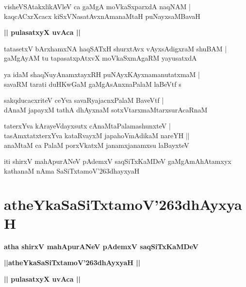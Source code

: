 \documentclass[twoside,12pt,openright]{book}
\def\S{\char'263}
\newcounter{shloka}[chapter]
\def\uvaca#1{\centerline{{\large\textbf{#1}}}}
\begin{document}
\begin{shloka}%
visheVSAtakxlikAVleV ca gaMgA moVkaSxparxdA naqNAM |\\
kaqcACxrXcacx kiSxVNasatAvxnAmanaMtaH puNayxsaMBavaH 
\end{shloka}

\uvaca{|| pulasatxyX uvAca ||}

\begin{shloka}%
tatasetxV bArxhamxNA haqSATxH shurxtAvx vAyxsAdigxraM shuBAM |\\
gaMgAyAM tu tapasatxpAtxvX moVkaSxmAgaRM yayusatxdA 
\end{shloka}

\begin{shloka}%
ya idaM shaqNuyAnamxtayxRH puNAyxKAyxnamanutatxmaM |\\
savaRM tarati duHKwGaM gaMgAsAnxnaPalaM laBeVtf s
\end{shloka}

\begin{shloka}%
sakqducacxriteV ceYva savaRyajacnxPalaM BaveVtf |\\
dAnaM japayxM tathA dhAyxnaM sotxVtarxmaMtarxsurAcaRnaM 
\end{shloka}

\begin{shloka}%
taterxYva kArayeVdayxsutx cAnaMtaPalamashunxteV |\\
tasAmxtatxterxYva kataRvayxM japahoVmAdikaM nareYH ||\\
anaMtaM ca PalaM porxVkatxM janamxjanamxsu laBayxteV 
\end{shloka}

\begin{center}
iti shirxV mahApurANeV pAdemxV saqSiTxKaMDeV gaMgAmAhAtamxyx kathanaM nAma SaSiTxtamoV\S dhayxyaH
\end{center}

\chapter{atheYkaSaSiTxtamoV\S dhAyxyaH}

\begin{center}
{\LARGE\bfseries atha shirxV mahApurANeV pAdemxV saqSiTxKaMDeV}
\end{center}

\begin{center}
{\LARGE\bfseries ||atheYkaSaSiTxtamoV\S dhAyxyaH || }
\end{center}

\uvaca{|| pulasatxyX uvAca ||}
\end{document}
